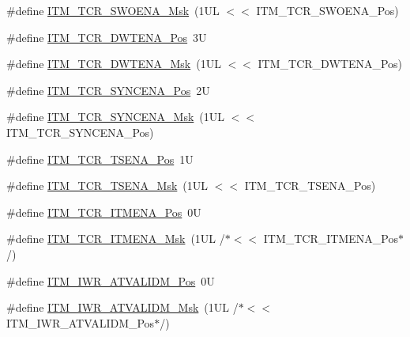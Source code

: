 \begin{DoxyCompactItemize}
\item 
\#define \mbox{\hyperlink{group__CMSIS__ITM_ga97476cb65bab16a328b35f81fd02010a}{I\+T\+M\+\_\+\+T\+C\+R\+\_\+\+S\+W\+O\+E\+N\+A\+\_\+\+Msk}}~(1\+U\+L $<$$<$ I\+T\+M\+\_\+\+T\+C\+R\+\_\+\+S\+W\+O\+E\+N\+A\+\_\+\+Pos)
\item 
\#define \mbox{\hyperlink{group__CMSIS__ITM_ga30e83ebb33aa766070fe3d1f27ae820e}{I\+T\+M\+\_\+\+T\+C\+R\+\_\+\+D\+W\+T\+E\+N\+A\+\_\+\+Pos}}~3U
\item 
\#define \mbox{\hyperlink{group__CMSIS__ITM_ga98ea1c596d43d3633a202f9ee746cf70}{I\+T\+M\+\_\+\+T\+C\+R\+\_\+\+D\+W\+T\+E\+N\+A\+\_\+\+Msk}}~(1\+U\+L $<$$<$ I\+T\+M\+\_\+\+T\+C\+R\+\_\+\+D\+W\+T\+E\+N\+A\+\_\+\+Pos)
\item 
\#define \mbox{\hyperlink{group__CMSIS__ITM_gaa93a1147a39fc63980d299231252a30e}{I\+T\+M\+\_\+\+T\+C\+R\+\_\+\+S\+Y\+N\+C\+E\+N\+A\+\_\+\+Pos}}~2U
\item 
\#define \mbox{\hyperlink{group__CMSIS__ITM_gac89b74a78701c25b442105d7fe2bbefb}{I\+T\+M\+\_\+\+T\+C\+R\+\_\+\+S\+Y\+N\+C\+E\+N\+A\+\_\+\+Msk}}~(1\+U\+L $<$$<$ I\+T\+M\+\_\+\+T\+C\+R\+\_\+\+S\+Y\+N\+C\+E\+N\+A\+\_\+\+Pos)
\item 
\#define \mbox{\hyperlink{group__CMSIS__ITM_ga5aa381845f810114ab519b90753922a1}{I\+T\+M\+\_\+\+T\+C\+R\+\_\+\+T\+S\+E\+N\+A\+\_\+\+Pos}}~1U
\item 
\#define \mbox{\hyperlink{group__CMSIS__ITM_ga436b2e8fa24328f48f2da31c00fc9e65}{I\+T\+M\+\_\+\+T\+C\+R\+\_\+\+T\+S\+E\+N\+A\+\_\+\+Msk}}~(1\+U\+L $<$$<$ I\+T\+M\+\_\+\+T\+C\+R\+\_\+\+T\+S\+E\+N\+A\+\_\+\+Pos)
\item 
\#define \mbox{\hyperlink{group__CMSIS__ITM_ga3286b86004bce7ffe17ee269f87f8d9d}{I\+T\+M\+\_\+\+T\+C\+R\+\_\+\+I\+T\+M\+E\+N\+A\+\_\+\+Pos}}~0U
\item 
\#define \mbox{\hyperlink{group__CMSIS__ITM_ga7dd53e3bff24ac09d94e61cb595cb2d9}{I\+T\+M\+\_\+\+T\+C\+R\+\_\+\+I\+T\+M\+E\+N\+A\+\_\+\+Msk}}~(1\+U\+L /$\ast$$<$$<$ I\+T\+M\+\_\+\+T\+C\+R\+\_\+\+I\+T\+M\+E\+N\+A\+\_\+\+Pos$\ast$/)
\item 
\#define \mbox{\hyperlink{group__CMSIS__ITM_ga04d3f842ad48f6a9127b4cecc963e1d7}{I\+T\+M\+\_\+\+I\+W\+R\+\_\+\+A\+T\+V\+A\+L\+I\+D\+M\+\_\+\+Pos}}~0U
\item 
\#define \mbox{\hyperlink{group__CMSIS__ITM_ga67b969f8f04ed15886727788f0e2ffd7}{I\+T\+M\+\_\+\+I\+W\+R\+\_\+\+A\+T\+V\+A\+L\+I\+D\+M\+\_\+\+Msk}}~(1\+U\+L /$\ast$$<$$<$ I\+T\+M\+\_\+\+I\+W\+R\+\_\+\+A\+T\+V\+A\+L\+I\+D\+M\+\_\+\+Pos$\ast$/)
\item 

\end{DoxyCompactItemize}
